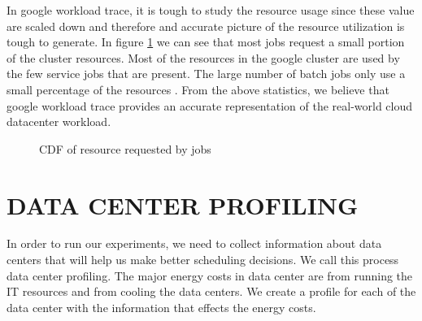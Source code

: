\documentclass[letterpaper,twocolumn,10pt]{article}
\begin{document}
In google workload trace, it is tough to study the resource usage since these value are scaled down and therefore and accurate picture of the resource utilization is tough to generate. In figure \ref{fig:resource} we can see that most jobs request a small portion of the cluster resources. Most of the resources in the google cluster are used by the few service jobs that are present. The large number of batch jobs only use a small percentage of the resources \cite{mishra2010towards} \cite{reiss2012heterogeneity}. From the above statistics, we believe that google workload trace provides an accurate representation of the real-world cloud datacenter workload.

\begin{figure} %
    \centering
    \newline
    
    \caption{CDF of resource requested by jobs}%
    \label{fig:resource}%
\end{figure}

\section{DATA CENTER PROFILING } \label{sec:datacenter}
In order to run our experiments, we need to collect information about data centers that will help us make better scheduling decisions. We call this process data center profiling. The major energy costs in data center are from running the IT resources and from cooling the data centers. We create a profile for each of the data center with the information that effects the energy costs.
\end{document}
